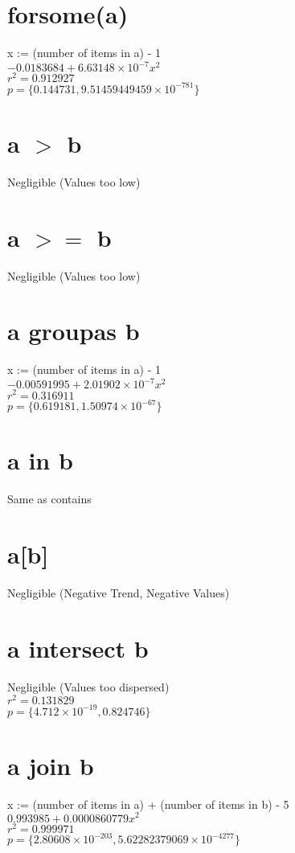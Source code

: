 \documentclass[12pt]{article}
\begin{document}
	\section{forsome(a)}
	x := (number of items in a) - 1\\
	$-0.0183684 + 6.63148 \times 10^{-7} x^2$\\
	$r^2 = 0.912927$\\
	$p = \{0.144731, 9.51459449459 \times 10^{-781}\}$
	
	\section{a $>$ b}
	Negligible (Values too low)
	
	\section{a $>=$ b}
	Negligible (Values too low)
	
	\section{a groupas b}
	x := (number of items in a) - 1\\
	$-0.00591995 + 2.01902 \times 10^{-7} x^2$\\
	$r^2 = 0.316911$\\
	$p = \{0.619181, 1.50974 \times 10^{-67}\}$
	
	\section{a in b}
	Same as contains
	
	\section{a[b]}
	Negligible (Negative Trend, Negative Values)
	
	\section{a intersect b}
	Negligible (Values too dispersed)\\
	$r^2 = 0.131829$\\
	$p = \{4.712 \times 10^{-19}, 0.824746\}$ %
	
	\section{a join b}
	x := (number of items in a) + (number of items in b) - 5\\
	$0.993985 + 0.0000860779 x^2$\\
	$r^2 = 0.999971$\\
	$p = \{2.80608 \times 10^{-203}, 5.62282379069 \times 10^{-4277}\}$
	
\end{document}
